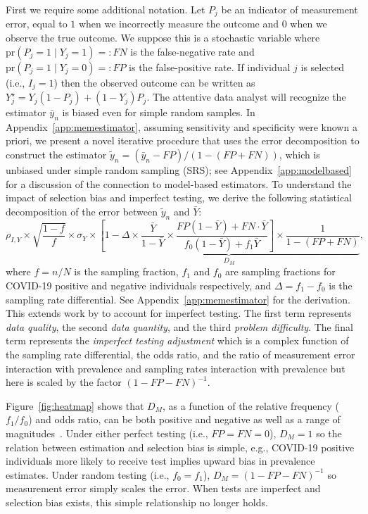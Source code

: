 \documentclass[11pt]{amsart}
\numberwithin{equation}{section}
\theoremstyle{plain}
\def\pr{\text{pr}}
\begin{document}
First we require some additional notation.  Let $P_j$ be an indicator of measurement error, equal to $1$ when we incorrectly measure the outcome and $0$ when we observe the true outcome. We suppose this is a stochastic variable where $\pr(P_j = 1 \mid Y_j = 1) =: FN$ is the false-negative rate and $\pr(P_j = 1 \mid Y_j = 0) =: FP$ is the false-positive rate.  If individual $j$ is selected (i.e., $I_j = 1$) then the observed outcome can be written as $Y_j^{\star} = Y_j(1-P_j) + (1-Y_j) P_j$.  The attentive data analyst will recognize the estimator $\bar y_n$ is biased even for simple random samples.  In Appendix~\ref{app:memestimator}, assuming sensitivity and specificity were known a priori, we present a novel iterative procedure that uses the error decomposition to construct the estimator $\tilde y_n = (\bar y_n - FP)/(1-(FP+FN))$, which is unbiased under simple random sampling (SRS); see Appendix~\ref{app:modelbased} for a discussion of the connection to model-based estimators. To understand the impact of selection bias and imperfect testing, we derive the following statistical decomposition of the error between $\tilde y_n$ and $\bar Y$:
\begin{equation}
\label{eq:statdecomp}
\rho_{I,Y} \times \sqrt{\frac{1-f}{f}} \times \sigma_{Y}
\times \underbrace{\left[ 1 - \Delta \times \frac{\bar Y}{1-\bar Y} \times \frac{FP(1-\bar Y) + FN \cdot \bar Y}{f_0 (1-\bar Y) + f_1 \bar Y} \right] \times \frac{1}{1-(FP+FN)}}_{D_M},
\end{equation}
where $f=n/N$ is the sampling fraction, $f_1$ and $f_0$ are sampling fractions for COVID-19 positive and negative individuals respectively, and $\Delta = f_1 - f_0$ is the sampling rate differential.  See Appendix~\ref{app:memestimator} for the derivation. This extends work by \cite{Meng2018} to account for imperfect testing. The first term represents \emph{data quality}, the second \emph{data quantity}, and the third \emph{problem difficulty}.  The final term represents the \emph{imperfect testing adjustment} which is a complex function of the sampling rate differential, the odds ratio, and the ratio of measurement error interaction with prevalence and sampling rates interaction with prevalence but here is scaled by the factor $(1 - FP - FN)^{-1}$.

Figure~\ref{fig:heatmap} shows that $D_M$, as a function of the relative frequency ($f_1/f_0$) and odds ratio, can be both positive and negative as well as a range of magnitudes~\citep{Beesley2020,Beesley2019,Smeden2019}. Under either perfect testing (i.e., $FP=FN=0$), $D_M = 1$ so the relation between estimation and selection bias is simple, e.g., COVID-19 positive individuals more likely to receive test implies upward bias in prevalence estimates. Under random testing (i.e., $f_0 = f_1$), $D_M = (1-FP-FN)^{-1}$ so measurement error simply scales the error. When tests are imperfect and selection bias exists, this simple relationship no longer holds.
\end{document}

